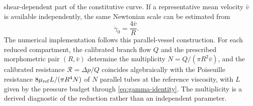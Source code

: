 \documentclass[lineno]{jfm}
\begin{document}
shear-dependent part of the constitutive curve.
If a representative mean velocity $\bar v$ is available independently, the
same Newtonian scale can be estimated from
\begin{equation}
\dot{\gamma}_0
=
\frac{4\bar v}{R}.
\label{eq:gamma-velocity}
\end{equation}
The numerical implementation follows this parallel-vessel construction. For
each reduced compartment, the calibrated branch flow $Q$ and the prescribed
morphometric pair $(R,\bar v)$ determine the multiplicity
$N=Q/(\pi R^2\bar v)$, and the calibrated resistance
$\mathcal{R}=\Delta p/Q$ coincides algebraically with the Poiseuille
resistance $8\mu_{\rm ref}L/(\pi R^4 N)$ of $N$ parallel tubes at the
reference viscosity, with $L$ given by the pressure budget through
\eqref{eq:gamma-identity}. The multiplicity is a derived diagnostic of the
reduction rather than an independent parameter.
\end{document}
